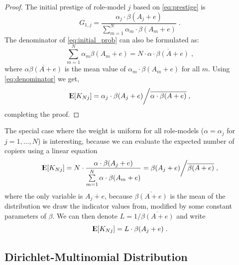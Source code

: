 \documentclass[12pt]{extarticle}
\DeclareMathOperator*{\E}{{\rm I\kern-.3em E}}
\begin{document}
\begin{proof}
The initial prestige of role-model $j$ based on \cref{eq:prestige} is
\begin{equation}\label{eq:initial_prob}
G_{1,j} = \frac{\alpha_j\cdot\beta(A_j+e)}{\sum\limits_{m=1}^{N} \alpha_m\cdot\beta(A_m+e)} \;.
\end{equation}
The denominator of \cref{eq:initial_prob} can also be formulated as:
\begin{equation}\label{eq:denominator}
 \sum\limits_{m=1}^{N}\alpha_m\beta(A_m+e) = N \cdot \overline{\alpha \cdot \beta(A+e)} \;,
\end{equation}
where $\overline{\alpha\beta(A+e)}$ is the mean value of $\alpha_m\cdot\beta(A_m+e)$ for all $m$.
Using \cref{eq:denominator} we get, %
\begin{equation}
\E[K_{Nj}] = \alpha_j \cdot \beta(A_j+e) \bigg/ \overline{\alpha \cdot \beta(A+e)} \;,
\end{equation}
completing the proof.
\end{proof}

The special case where the weight is uniform for all role-models ($\alpha = \alpha_j$ for $j=1,\ldots, N$) is interesting, because we can evaluate the expected number of copiers using a linear equation
\begin{equation}
\E[K_{Nj}]= N\cdot\frac{\alpha\cdot\beta(A_j+e)}{\sum\limits_{m=1}^{N}\alpha\cdot\beta(A_m+e)} =\beta(A_j+e) \bigg/ \overline{\beta(A+e)} \;,
\end{equation}
where the only variable is $A_j+e$, because $\overline{\beta(A+e)}$ is the mean of the distribution we draw the indicator values from, modified by some constant parameters of $\beta$.
We can then denote $L = 1/\overline{\beta(A+e)}$ and write
\begin{equation}\label{eq:linearEq}
\E[K_{Nj}] = L\cdot \beta(A_j+e) \;.
\end{equation}


\subsection*{Dirichlet-Multinomial Distribution}
\end{document}
